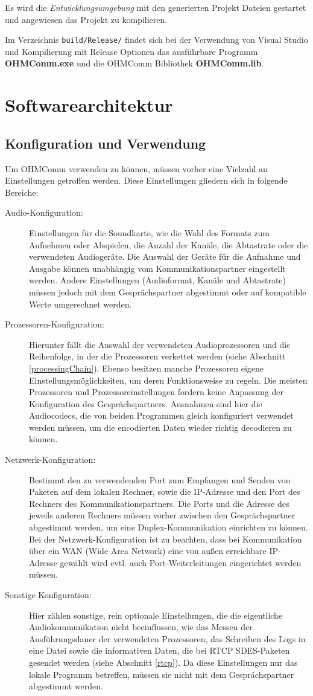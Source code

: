 Es wird die \textit{Entwicklungsumgebung} mit den generierten Projekt Dateien gestartet und angewiesen das Projekt zu kompilieren.

Im Verzeichnis \texttt{build/Release/} findet sich bei der Verwendung von Visual Studio und Kompilierung mit Release Optionen das ausführbare Programm \textbf{OHMComm.exe} und die OHMComm Bibliothek \textbf{OHMComm.lib}.

\section{Softwarearchitektur}
\subsection{Konfiguration und Verwendung}
\label{configurationUsages}
Um OHMComm verwenden zu können, müssen vorher eine Vielzahl an Einstellungen getroffen werden. Diese Einstellungen gliedern sich in folgende Bereiche:
\begin{description}
\item[Audio-Konfiguration:]Einstellungen für die Soundkarte, wie die Wahl des Formats zum Aufnehmen oder Abspielen, die Anzahl der Kanäle, die Abtastrate oder die verwendeten Audiogeräte. Die Auswahl der Geräte für die Aufnahme und Ausgabe können unabhängig vom Kommunikationspartner eingestellt werden. Andere Einstellungen (Audioformat, Kanäle und Abtastrate) müssen jedoch mit dem Gesprächspartner abgestimmt oder auf kompatible Werte umgerechnet werden.
\item[Prozessoren-Konfiguration:]Hierunter fällt die Auswahl der verwendeten Audioprozessoren und die Reihenfolge, in der die Prozessoren verkettet werden (siehe Abschnitt \ref{processingChain}). Ebenso besitzen manche Prozessoren eigene Einstellungsmöglichkeiten, um deren Funktionsweise zu regeln. Die meisten Prozessoren und Prozessoreinstellungen fordern keine Anpassung der Konfiguration des Gesprächspartners. Ausnahmen sind hier die Audiocodecs, die von beiden Programmen gleich konfiguriert verwendet werden müssen, um die encodierten Daten wieder richtig decodieren zu können.
\item[Netzwerk-Konfiguration:]Bestimmt den zu verwendenden Port zum Empfangen und Senden von Paketen auf dem lokalen Rechner, sowie die IP-Adresse und den Port des Rechners des Kommunikationspartners. Die Ports und die Adresse des jeweils anderen Rechners müssen vorher zwischen den Gesprächspartner abgestimmt werden, um eine Duplex-Kommunikation einrichten zu können. Bei der Netzwerk-Konfiguration ist zu beachten, dass bei Kommunikation über ein WAN (Wide Area Network) eine von außen erreichbare IP-Adresse gewählt wird evtl. auch Port-Weiterleitungen eingerichtet werden müssen.
\item[Sonstige Konfiguration:] Hier zählen sonstige, rein optionale Einstellungen, die die eigentliche Audiokommunikation nicht beeinflussen, wie das Messen der Ausführungsdauer der verwendeten Prozessoren, das Schreiben des Logs in eine Datei sowie die informativen Daten, die bei RTCP SDES-Paketen gesendet werden (siehe Abschnitt \ref{rtcp}). Da diese Einstellungen nur das lokale Programm betreffen, müssen sie nicht mit dem Gesprächspartner abgestimmt werden.
\end{description}
